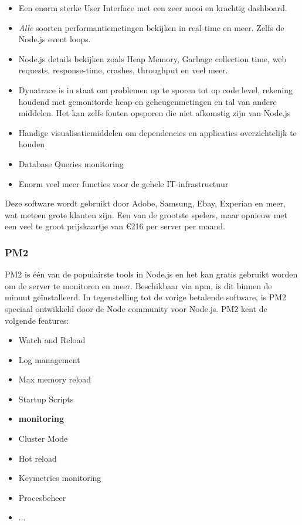 \begin{itemize}
	\item Een enorm sterke User Interface met een zeer mooi en krachtig dashboard.
	\item \textit{Alle} soorten performantiemetingen bekijken in real-time en meer. Zelfs de Node.js event loops.
	\item Node.js details bekijken zoals Heap Memory, Garbage collection time, web requests, response-time, crashes, throughput en veel meer.
	\item Dynatrace is in staat om problemen op te sporen tot op code level, rekening houdend met gemonitorde heap-en geheugenmetingen en tal van andere middelen. Het kan zelfs fouten opsporen die niet afkomstig zijn van Node.js
	\item Handige visualisatiemiddelen om dependencies en applicaties overzichtelijk te houden
	\item Database Queries monitoring
	\item Enorm veel meer functies voor de gehele IT-infrastructuur
\end{itemize}

Deze software wordt gebruikt door Adobe, Samsung, Ebay, Experian en meer, wat meteen grote klanten zijn. Een van de grootste spelers, maar opnieuw met een veel te groot prijskaartje van \euro216 per server per maand.

\subsubsection{PM2}
\label{sec:pm2}

PM2 is één van de populairste tools in Node.js en het kan gratis gebruikt worden om de server te monitoren en meer. Beschikbaar via npm, is dit binnen de minuut geïnstalleerd. In tegenstelling tot de vorige betalende software, is PM2 speciaal ontwikkeld door de Node community voor Node.js. PM2 kent de volgende features:

\begin{itemize}
	\item Watch and Reload
	\item Log management
	\item Max memory reload
	\item Startup Scripts
	\item \textbf{monitoring}
	\item Cluster Mode
	\item Hot reload
	\item Keymetrics monitoring
	\item Procesbeheer
	\item ...
\end{itemize}


